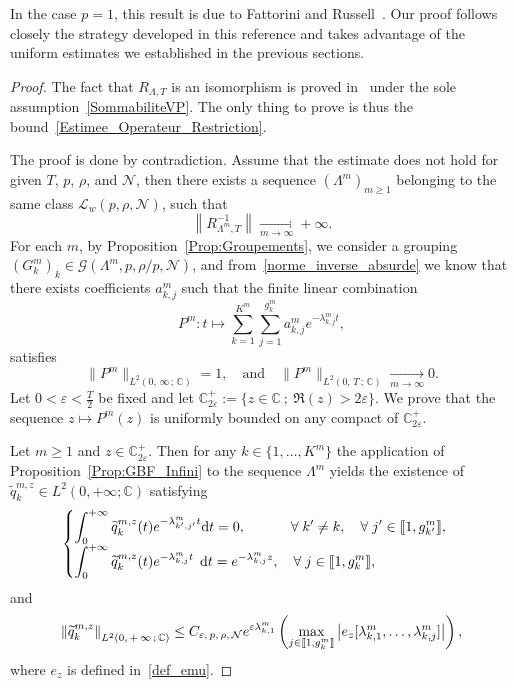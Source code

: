 \documentclass[11pt]{article}
\theoremstyle{definition}
\numberwithin{equation}{section}
\numberwithin{figure}{section}
\numberwithin{table}{section}
\newcommand{\llbracket}{\mathopen{[\mkern -2.7mu[}}
\newcommand{\rrbracket}{\mathclose{]\mkern -2.7mu]}}
\newcommand{\inter}[2]{\llbracket #1,#2 \rrbracket}
\newcommand{\n}{g}
\newcommand{\LL}{\mathcal{L}}
\newcommand{\NN}{\mathcal{N}}
\newcommand{\C}{\mathbb{C}}
\newcommand{\Cpeps}{\mathbb{C}^+_{2\varepsilon}}
\newcommand{\md}{\mathrm{d}}
\let\oldforall\forall
\renewcommand*{\forall}{\mathrel{\oldforall}}
\begin{document}
In the case $p=1$, this result is due to Fattorini and Russell~\cite[Theorem~1.3]{FattoriniRussell74}. Our proof follows closely the strategy developed in this reference and takes advantage of the uniform estimates we established in the previous sections.



\begin{proof}
The fact that $R_{\Lambda,T}$ is an isomorphism is proved in~\cite{SchwartzThese} under the sole assumption~\eqref{SommabiliteVP}. The only thing to prove is thus the bound~\eqref{Estimee_Operateur_Restriction}.

The proof is done by contradiction. Assume that the estimate does not hold for given $T$, $p$, $\rho$, and $\NN$, then there exists a sequence $(\Lambda^m)_{m \geq 1}$ belonging to the same class $\LL_w(p,\rho,\NN)$, such that
\begin{equation}\label{norme_inverse_absurde}
\left\|R_{\Lambda^m,T}^{-1}\right\| \xrightarrow[m\to \infty]{} +\infty.
\end{equation}
For each $m$, by Proposition~\ref{Prop:Groupements}, we consider a grouping $(G^m_k)_k\in \mathcal{G}(\Lambda^m,p,\rho/p,\NN)$, and from~\eqref{norme_inverse_absurde} we know that there exists coefficients $a_{k,j}^m$ such that the finite linear combination
\[
P^m : t \mapsto \sum_{k=1}^{K^m} \sum_{j=1}^{\n_k^m} a_{k,j}^m e^{-\lambda^m_{k,j} t},
\]
satisfies
\[
\|P^m\|_{L^2(0,\,\infty\,;\,\C)} = 1,
\quad \text{and} \quad
\|P^m\|_{L^2(0,\,T\,;\,\C)} \xrightarrow[m\to \infty]{} 0.
\]
Let $0 < \varepsilon < \frac{T}{2}$ be fixed and let $\Cpeps := \{z \in \C \: ; \: \Re(z)>2\varepsilon\}$. We prove that the sequence $z\mapsto P^m(z)$ is uniformly bounded on any compact of $\Cpeps$.

Let $m \geq 1$ and $z \in \Cpeps$. Then for any $k \in \{1, \dots, K^m \}$ the application of Proposition~\ref{Prop:GBF_Infini} to the sequence $\Lambda^m$ yields the existence of $\widetilde{q}_k^{m,z}\in L^2(0,+\infty;\C)$ satisfying
\begin{equation}\label{equations_qkmz}
\begin{cases}
\displaystyle\int_0^{+\infty} \widetilde{q}_k^{m,z}(t) e^{-\lambda^m_{k',j'} t} \md t = 0, \mkern58mu \forall k' \neq k, \quad \forall j'\in \inter{1}{\n^m_{k'}},
\\
\displaystyle\int_0^{+\infty} \widetilde{q}_k^{m,z}(t) e^{-\lambda^m_{k,j} t} \;\,\md t = e^{-\lambda^m_{k,j} z}, \quad \forall j \in \inter{1}{\n^m_k},
\end{cases}
\end{equation}
and
\[
\left\| \widetilde{q}_k^{m,z} \right\|_{L^2(0,\,+\,\infty\,;\,\C)} \leq C_{\varepsilon,\,p,\,\rho,\,\NN} e^{ \varepsilon \lambda^m_{k,1}} \left(\max_{j\in \inter{1}{\n^m_k}} \left| e_z[\lambda^m_{k,1},\dotsc,\lambda^m_{k,j}] \right| \right),
\]
where $e_z$ is defined in~\eqref{def_emu}.



\end{proof}
\end{document}
